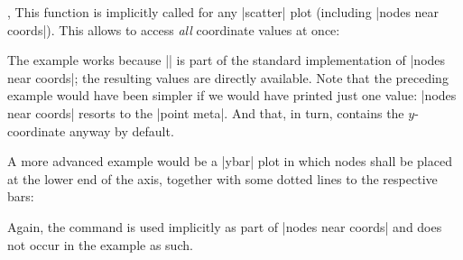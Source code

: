 \begin{commandlist}{\pgfplotspointgetcoordinates,\pgfplotspointgetcoordinates{}}
    This function is implicitly called for any |scatter| plot (including
    |nodes near coords|). This allows to access \emph{all} coordinate values at
    once:
\begin{codeexample}[]
\end{codeexample}
    The example works because |\pgfplotspointgetcoordinates| is part of the
    standard implementation of |nodes near coords|; the resulting values are
    directly available. Note that the preceding example would have been simpler
    if we would have printed just one value: |nodes near coords| resorts to the
    |point meta|. And that, in turn, contains the $y$-coordinate anyway by
    default.

    A more advanced example would be a |ybar| plot in which nodes shall be
    placed at the lower end of the axis, together with some dotted lines to the
    respective bars:
\begin{codeexample}[]
\end{codeexample}
    Again, the command is used implicitly as part of |nodes near coords| and
    does not occur in the example as such.


\end{commandlist}
